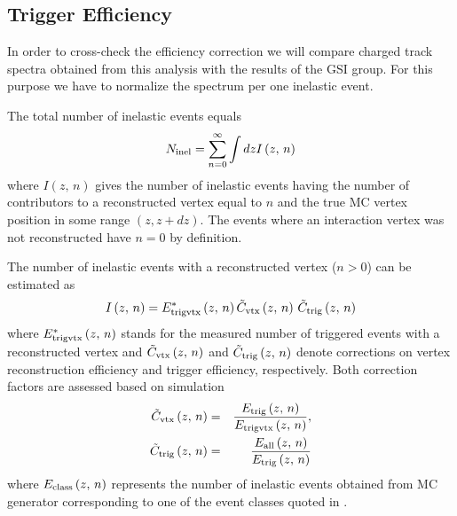 \documentclass[ALICE,manyauthors]{ALICE_internal_notes}
\begin{document}
 \subsection{Trigger Efficiency}
In order to cross-check the efficiency correction we will compare charged track \pt{} spectra obtained
from this analysis with the results of the GSI group. For this purpose we have to normalize the \pt{}
spectrum per one inelastic event.

The total number of inelastic events equals
\begin{equation}
  N_{\rm inel} = \sum_{n=0}^{\infty} \int dz  I\left(z,\, n\right)
\end{equation}
where $I\left(z,\, n\right)$ gives the number of inelastic events having the number of contributors to a reconstructed
vertex equal to $n$ and the true MC vertex position in some range $(z,z+dz)$. The events where an interaction vertex was not reconstructed
have $n=0$ by definition.

The number of inelastic events with a reconstructed vertex ($n>0$) can be estimated as
\begin{equation}
I\left(z,\, n\right) = E^{*}_{\rm trigvtx}\left(z,\, n\right)\tilde{C}_{\rm vtx}\left(z,\,n\right)\,\tilde{C}_{\rm trig}\left(z,\,n\right)
\end{equation}
where $E^{*}_{\rm trigvtx}\left(z,\, n\right)$ stands for the measured number of triggered events with a reconstructed vertex
and $\tilde{C}_{\rm vtx}\left(z,\,n\right)$ and $\tilde{C}_{\rm trig}\left(z,\,n\right)$ denote corrections on
vertex reconstruction efficiency and trigger efficiency, respectively. Both correction factors are assessed
based on simulation
\begin{eqnarray}
 \tilde{C}_{\rm vtx} \left(z,\, n\right)&=& { E_{\rm trig} \left(z,\, n\right) \over  E_{\rm trigvtx} \left(z,\, n\right)},\\
 \tilde{C}_{\rm trig} \left(z,\, n\right)&=& { E_{\rm all} \left(z,\, n\right) \over  E_{\rm trig} \left(z,\, n\right)}
\end{eqnarray}
where  $E_{\rm class} \left(z,\, n\right)$ represents the number of inelastic events obtained from MC generator corresponding
to one of the event classes quoted in .
\end{document}
